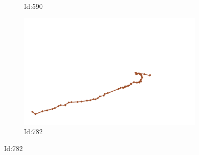 \documentclass[12pt,twoside]{report}
\begin{document}
\begin{figure}
\begin{subfigure}[b]{0.20\textwidth}
\caption{Id:590}
\end{subfigure}
\begin{subfigure}[b]{0.20\textwidth}
\centering
\includegraphics[width=\textwidth]{../../trajectories/782.png}
\caption{Id:782}
\end{subfigure}
\end{figure}
\end{document}
